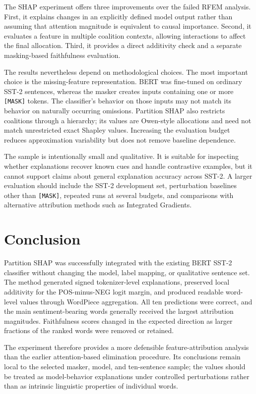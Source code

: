 \documentclass[11pt,a4paper]{article}
\begin{document}
The SHAP experiment offers three improvements over the failed RFEM analysis.
First, it explains changes in an explicitly defined model output rather than
assuming that attention magnitude is equivalent to causal importance. Second,
it evaluates a feature in multiple coalition contexts, allowing interactions to
affect the final allocation. Third, it provides a direct additivity check and a
separate masking-based faithfulness evaluation.

The results nevertheless depend on methodological choices. The most important
choice is the missing-feature representation. BERT was fine-tuned on ordinary
SST-2 sentences, whereas the masker creates inputs containing one or more
\texttt{[MASK]} tokens. The classifier's behavior on those inputs may not match
its behavior on naturally occurring omissions. Partition SHAP also restricts
coalitions through a hierarchy; its values are Owen-style allocations and need
not match unrestricted exact Shapley values. Increasing the evaluation budget
reduces approximation variability but does not remove baseline dependence.

The sample is intentionally small and qualitative. It is suitable for inspecting
whether explanations recover known cues and handle contrastive examples, but it
cannot support claims about general explanation accuracy across SST-2. A larger
evaluation should include the SST-2 development set, perturbation baselines other
than \texttt{[MASK]}, repeated runs at several budgets, and comparisons with
alternative attribution methods such as Integrated Gradients.

\section{Conclusion}

Partition SHAP was successfully integrated with the existing BERT SST-2
classifier without changing the model, label mapping, or qualitative sentence
set. The method generated signed tokenizer-level explanations, preserved local
additivity for the POS-minus-NEG logit margin, and produced readable word-level
values through WordPiece aggregation. All ten predictions were correct, and the
main sentiment-bearing words generally received the largest attribution
magnitudes. Faithfulness scores changed in the expected direction as larger
fractions of the ranked words were removed or retained.

The experiment therefore provides a more defensible feature-attribution analysis
than the earlier attention-based elimination procedure. Its conclusions remain
local to the selected masker, model, and ten-sentence sample; the values should be
treated as model-behavior explanations under controlled perturbations rather than
as intrinsic linguistic properties of individual words.
\end{document}
